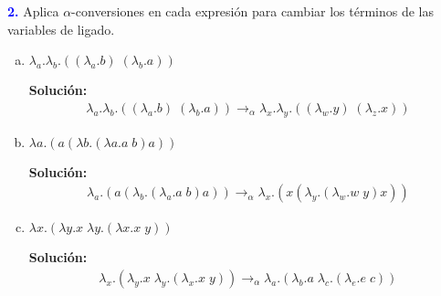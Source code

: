 \textbf{\textcolor{blue}{2.}} \Large
Aplica $\alpha$-conversiones en cada expresión
para cambiar los términos de las variables de ligado.
\begin{enumerate}[a)]
    \item $\lambda_a .\lambda_b .((\lambda_a .b) \; (\lambda_b .a))$
    
    \textbf{Solución:}
    \begin{eqnarray*}
        \lambda_a . \lambda_b . ((\lambda_a . b) \; (\lambda_b . a))
        \rightarrow_{\alpha} \lambda_x . \lambda_y . ((\lambda_w . y) \; (\lambda_z . x))
        \end{eqnarray*}
    \item $\lambda a.(a(\lambda b.(\lambda a.a\; b)a))$
    
    \textbf{Solución:}
    \begin{eqnarray*}
        \lambda_a .(a(\lambda_b .(\lambda_a .a\; b)a))
        \rightarrow_{\alpha} \lambda_x .(x(\lambda_y .(\lambda_w .w\; y)x))
    \end{eqnarray*}
    \item $\lambda x.(\lambda y.x\; \lambda y.(\lambda x.x \; y))$
    
    \textbf{Solución:}
    \begin{eqnarray*}
        \lambda_x .(\lambda_y .x\; \lambda_y .(\lambda_x .x \; y))
        \rightarrow_{\alpha} \lambda_a .(\lambda_b .a\; \lambda_c .(\lambda_e .e \; c))
    \end{eqnarray*}
\end{enumerate}

